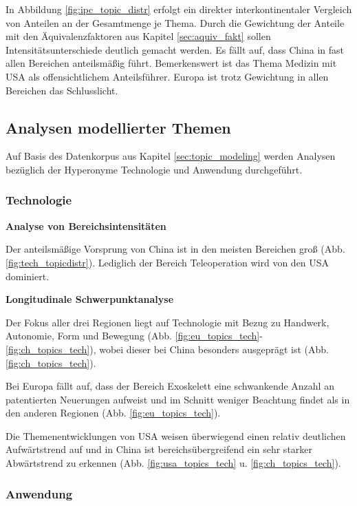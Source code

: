 In Abbildung \ref{fig:ipc_topic_distr} erfolgt ein direkter interkontinentaler Vergleich von Anteilen an der Gesamtmenge je Thema. Durch die Gewichtung der Anteile mit den Äquivalenzfaktoren aus Kapitel \ref{sec:aquiv_fakt} sollen Intensitätsunterschiede deutlich gemacht werden. Es fällt auf, dass China in fast allen Bereichen anteilsmäßig führt. Bemerkenswert ist das Thema Medizin mit USA als offensichtlichem Anteilsführer. Europa ist trotz Gewichtung in allen Bereichen das Schlusslicht. 


\subsection{Analysen modellierter Themen}

Auf Basis des Datenkorpus aus Kapitel \ref{sec:topic_modeling} werden Analysen bezüglich der Hyperonyme Technologie und Anwendung durchgeführt.

\subsubsection{Technologie}

\textbf{Analyse von Bereichsintensitäten}

Der anteilsmäßige Vorsprung von China ist in den meisten Bereichen groß (Abb. \ref{fig:tech_topicdistr}). Lediglich der Bereich Teleoperation wird von den USA dominiert.

\textbf{Longitudinale Schwerpunktanalyse}

Der Fokus aller drei Regionen liegt auf Technologie mit Bezug zu Handwerk, Autonomie, Form und Bewegung (Abb. \ref{fig:eu_topics_tech}-\ref{fig:ch_topics_tech}), wobei dieser bei China besonders ausgeprägt ist (Abb. \ref{fig:ch_topics_tech}).

Bei Europa fällt auf, dass der Bereich Exoskelett eine schwankende Anzahl an patentierten Neuerungen aufweist und im Schnitt weniger Beachtung findet als in den anderen Regionen (Abb. \ref{fig:eu_topics_tech}).

Die Themenentwicklungen von USA weisen überwiegend einen relativ deutlichen Aufwärtstrend auf und in China ist bereichsübergreifend ein sehr starker Abwärtstrend zu erkennen (Abb. \ref{fig:usa_topics_tech} u. \ref{fig:ch_topics_tech}).



\subsubsection{Anwendung}

